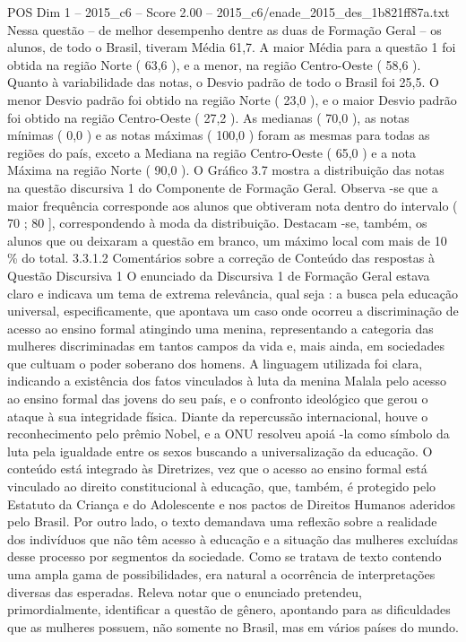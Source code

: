\begin{textsample}{POS Dim 1 – 2015\_c6 – Score 2.00 – 2015\_c6/enade\_2015\_des\_1b821ff87a.txt}
Nessa questão – de melhor desempenho dentre as duas de Formação Geral – os alunos, de todo o Brasil, tiveram Média 61,7.
A maior Média para a questão 1 foi obtida na região Norte ( 63,6 ), e a menor, na região Centro-Oeste ( 58,6 ).
Quanto à variabilidade das notas, o Desvio padrão de todo o Brasil foi 25,5.
O menor Desvio padrão foi obtido na região Norte ( 23,0 ), e o maior Desvio padrão foi obtido na região Centro-Oeste ( 27,2 ).
As medianas ( 70,0 ), as notas mínimas ( 0,0 ) e as notas máximas ( 100,0 ) foram as mesmas para todas as regiões do país, exceto a Mediana na região Centro-Oeste ( 65,0 ) e a nota Máxima na região Norte ( 90,0 ).
O Gráfico 3.7 mostra a distribuição das notas na questão discursiva 1 do Componente de Formação Geral.
Observa -se que a maior frequência corresponde aos alunos que obtiveram nota dentro do intervalo ( 70 ; 80 ], correspondendo à moda da distribuição.
Destacam -se, também, os alunos que ou deixaram a questão em branco, um máximo local com mais de 10 \% do total. 3.3.1.2 Comentários sobre a correção de Conteúdo das respostas à Questão Discursiva 1 O enunciado da Discursiva 1 de Formação Geral estava claro e indicava um tema de extrema relevância, qual seja : a busca pela educação universal, especificamente, que apontava um caso onde ocorreu a discriminação de acesso ao ensino formal atingindo uma menina, representando a categoria das mulheres discriminadas em tantos campos da vida e, mais ainda, em sociedades que cultuam o poder soberano dos homens.
A linguagem utilizada foi clara, indicando a existência dos fatos vinculados à luta da menina Malala pelo acesso ao ensino formal das jovens do seu país, e o confronto ideológico que gerou o ataque à sua integridade física.
Diante da repercussão internacional, houve o reconhecimento pelo prêmio Nobel, e a ONU resolveu apoiá -la como símbolo da luta pela igualdade entre os sexos buscando a universalização da educação.
O conteúdo está integrado às Diretrizes, vez que o acesso ao ensino formal está vinculado ao direito constitucional à educação, que, também, é protegido pelo Estatuto da Criança e do Adolescente e nos pactos de Direitos Humanos aderidos pelo Brasil.
Por outro lado, o texto demandava uma reflexão sobre a realidade dos indivíduos que não têm acesso à educação e a situação das mulheres excluídas desse processo por segmentos da sociedade.
Como se tratava de texto contendo uma ampla gama de possibilidades, era natural a ocorrência de interpretações diversas das esperadas.
Releva notar que o enunciado pretendeu, primordialmente, identificar a questão de gênero, apontando para as dificuldades que as mulheres possuem, não somente no Brasil, mas em vários países do mundo.

\end{textsample}
